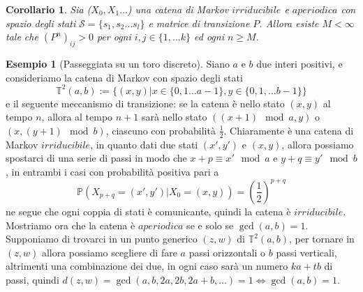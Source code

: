 \documentclass{article}
\newtheorem{corollary}[theorem]{Corollario}
\theoremstyle{definition}
\theoremstyle{definition}
\newtheorem{example}[theorem]{Esempio}
\theoremstyle{remark}
\begin{document}
\begin{corollary}
    Sia ($X_0,X_1\dots$) una catena di Markov $irriducibile$ e $aperiodica$ con spazio degli stati $\mathcal{S} =\{s_1,s_2\dots s_l\}$ e matrice di
    transizione $P$. Allora esiste $M<\infty$ tale che $(P^n)_{ij}>0$ per ogni $i,j\in\{1,\dots k\}$ ed ogni $n\ge M$.
\end{corollary}
\begin{example}[Passeggiata su un toro discreto]
    Siano $a$ e $b$ due interi positivi, e consideriamo la catena di Markov con spazio degli stati
    $$\mathbb{T}^2(a,b):=\{(x,y) | x\in \{0,1\dots a-1\}, y \in \{0,1,\dots b-1\}\}$$
    e il seguente meccanismo di transizione: se la catena è nello stato $(x,y)$ al tempo $n$, allora al tempo $n+1$ sarà nello stato $((x+1)\mod a,y)$ o $(x,(y+1) \mod b)$,
    ciascuno con probabilità $\frac{1}{2}$. Chiaramente è una catena di Markov $irriducibile$, in quanto dati due stati $(x',y')$ e  $(x,y)$,
    allora possiamo spostarci di una serie di passi  in modo che $x+p \equiv x' \mod a$ e $y+q \equiv y'\mod b$, in entrambi i casi con probabilità positiva pari a
    $$\mathbb{P}(X_{p+q} = (x',y')| X_0 = (x,y)) = \left(\frac{1}{2}\right)^{p+q}$$
    ne segue che ogni coppia di stati è comunicante, quindi la catena è $irriducibile$. Mostriamo ora che la catena è $aperiodica$ se e solo se  $\gcd(a,b) = 1$. Supponiamo
    di trovarci in un punto generico $(z,w)$ di $\mathbb{T}^2(a,b)$, per tornare in $(z,w)$ allora possiamo scegliere di fare $a$ passi orizzontali o $b$ passi verticali, altrimenti una
    combinazione dei due, in ogni caso sarà un numero $ka+tb$ di passi, quindi $d(z,w) = \gcd(a,b,2a,2b,2a+b,\dots) = 1 \iff  \gcd(a,b) = 1$.
\end{example}
\end{document}
